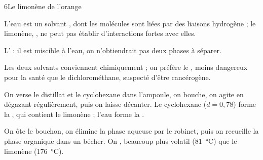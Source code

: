 \begin{corrigeBac}{6}{Le limonène de l'orange}
\begin{questions}
\item L'eau est un solvant , dont les molécules sont liées par des liaisons hydrogène ; le limonène, , ne
peut pas établir d'interactions fortes avec elles. \pts{1 pt}
\item L' : il est miscible à l'eau, on n'obtiendrait pas deux phases à séparer. \pts{1 pt}
\item Les deux solvants conviennent chimiquement ; on préfère le , moins dangereux pour la santé que le
dichlorométhane, suspecté d'être cancérogène. \pts{1 pt}
\item On verse le distillat et le cyclohexane dans l'ampoule, on bouche, on agite en dégazant régulièrement, puis on laisse décanter.
Le cyclohexane ($d=0{,}78$) forme la , qui contient le limonène ; l'eau forme la . 
\item On ôte le bouchon, on élimine la phase aqueuse par le robinet, puis on recueille la phase organique dans un bécher. On
, beaucoup plus volatil (\qty{81}{\degreeCelsius}) que le limonène (\qty{176}{\degreeCelsius}). \pts{1 pt}
\end{questions}
\end{corrigeBac}
